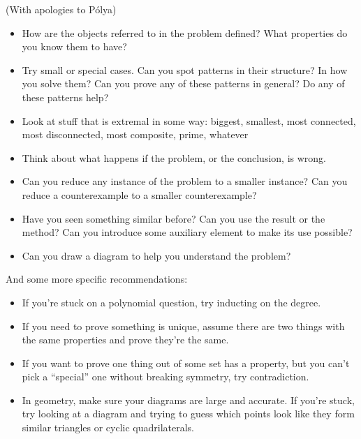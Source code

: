 (With apologies to P\'olya)
\begin{itemize}
  \item How are the objects referred to in the problem defined? What properties
    do you know them to have?
  \item Try small or special cases. Can you spot patterns in their structure? In
    how you solve them? Can you prove any of these patterns in general? Do any
    of these patterns help?
  \item Look at stuff that is extremal in some way: biggest, smallest, most
    connected, most disconnected, most composite, prime, whatever
  \item Think about what happens if the problem, or the conclusion, is wrong.
  \item Can you reduce any instance of the problem to a smaller instance? 
    Can you reduce a counterexample to a smaller counterexample?
  \item Have you seen something similar before? Can you use the result or the
    method? Can you introduce some auxiliary element to make its use possible?
  \item Can you draw a diagram to help you understand the problem?
\end{itemize}
And some more specific recommendations:
\begin{itemize}
  \item If you're stuck on a polynomial question, try inducting on the degree.
  \item If you need to prove something is unique, assume there are two things
    with the same properties and prove they're the same.
  \item If you want to prove one thing out of some set has a property, but you
    can't pick a ``special'' one without breaking symmetry, try contradiction.
  \item In geometry, make sure your diagrams are large and accurate. If you're
    stuck, try looking at a diagram and trying to guess which points look like
    they form similar triangles or cyclic quadrilaterals.
\end{itemize}

